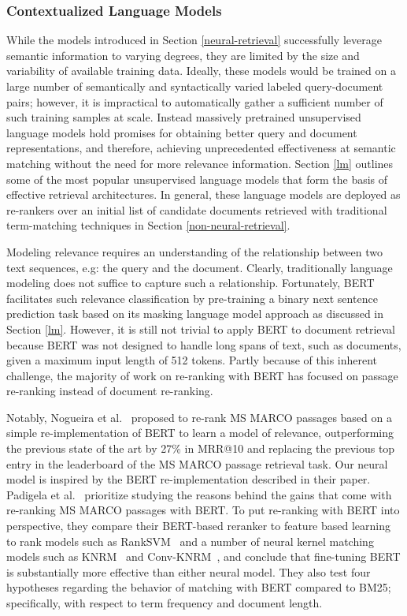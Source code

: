 \subsubsection{Contextualized Language Models}

While the models introduced in Section \ref{neural-retrieval} successfully leverage semantic information to varying degrees, they are limited by the size and variability of available training data.
Ideally, these models would be trained on a large number of semantically and syntactically varied labeled query-document pairs; however, it is impractical to automatically gather a sufficient number of such training samples at scale.
Instead massively pretrained unsupervised language models hold promises for obtaining better query and document representations, and therefore, achieving unprecedented effectiveness at semantic matching without the need for more relevance information.
Section \ref{lm} outlines some of the most popular unsupervised language models that form the basis of effective retrieval architectures.
In general, these language models are deployed as re-rankers over an initial list of candidate documents retrieved with traditional term-matching techniques in Section \ref{non-neural-retrieval}.

Modeling relevance requires an understanding of the relationship between two text sequences, e.g: the query and the document.
Clearly, traditionally language modeling does not suffice to capture such a relationship.
Fortunately, BERT facilitates such relevance classification by pre-training a binary next sentence prediction task based on its masking language model approach as discussed in Section \ref{lm}.
However, it is still not trivial to apply BERT to document retrieval because BERT was not designed to handle long spans of text, such as documents, given a maximum input length of 512 tokens.
Partly because of this inherent challenge, the majority of work on re-ranking with BERT has focused on 
passage re-ranking instead of document re-ranking.

Notably, Nogueira et al.~\cite{nogueira2019passage} proposed to re-rank MS MARCO passages based on a simple re-implementation of BERT to learn a model of relevance, outperforming the previous state of the art by 27\% in MRR@10 and replacing the previous top entry in the leaderboard of the MS MARCO passage retrieval task.
Our neural model is inspired by the BERT re-implementation described in their paper.
Padigela et al.~\cite{Padigela:1905.01758:2019} prioritize studying the reasons behind the gains that come with re-ranking MS MARCO passages with BERT.
To put re-ranking with BERT into perspective, they compare their BERT-based reranker to feature based learning to rank models such as RankSVM~\cite{joachims2002optimizing} and a number of neural kernel matching models such as KNRM~\cite{xiong2017knrm} and Conv-KNRM~\cite{dai2018convolutional}, and conclude that  fine-tuning BERT is substantially more effective than either neural model.
They also test four hypotheses regarding the behavior of matching with BERT compared to BM25; specifically, with respect to term frequency and document length.

